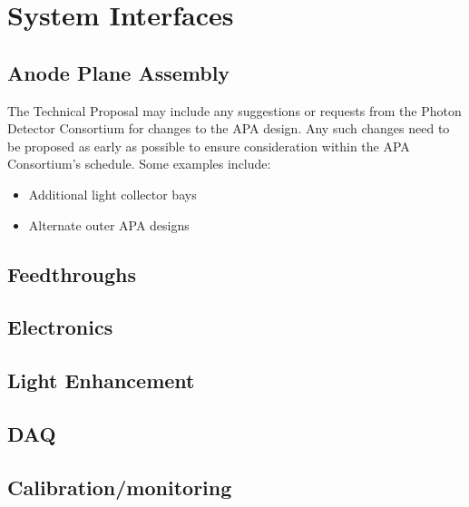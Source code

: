 \section{System Interfaces}
\label{sec:fdsp-pd-intfc}



\subsection{Anode Plane Assembly}
\label{sec:fdsp-pd-intfc-apa}

The Technical Proposal may include any suggestions or requests from the Photon Detector Consortium
for changes to the APA design. Any such changes need to be proposed as early as possible to ensure
consideration within the APA Consortium's schedule. Some examples include:
\begin{itemize}
\item Additional light collector bays
\item Alternate outer APA designs
\end{itemize}

\subsection{Feedthroughs}
\label{sec:fdsp-pd-intfc-feed}

\subsection{Electronics}
\label{sec:fdsp-pd-intfc-feed}

\subsection{Light Enhancement}
\label{sec:fdsp-pd-intfc-le}

\subsection{DAQ}
\label{sec:fdsp-pd-intfc-daq}

\subsection{Calibration/monitoring}
\label{sec:fdsp-pd-intfc-calib}

